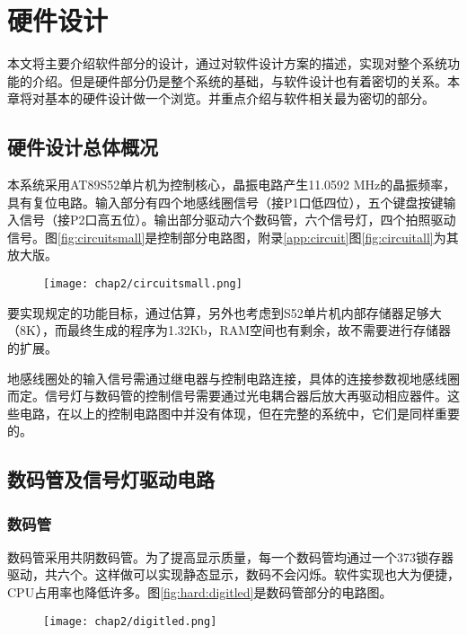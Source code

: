 

\chapter{硬件设计}
\label{chap:hardware}
	本文将主要介绍软件部分的设计，通过对软件设计方案的描述，实现对整个系统功能的介绍。但是硬件部分仍是整个系统的基础，与软件设计也有着密切的关系。本章将对基本的硬件设计做一个浏览。并重点介绍与软件相关最为密切的部分。
\section{硬件设计总体概况}
	本系统采用AT89S52单片机为控制核心，晶振电路产生11.0592 MHz的晶振频率，具有复位电路。输入部分有四个地感线圈信号（接P1口低四位），五个键盘按键输入信号（接P2口高五位）。输出部分驱动六个数码管，六个信号灯，四个拍照驱动信号。图\ref{fig:circuitsmall}是控制部分电路图，附录\ref{app:circuit}图\ref{fig:circuitall}为其放大版。
	
\begin{figure}[!tbh]
  \centering
  \texttt{[image: chap2/circuitsmall.png]}
\end{figure}
	要实现规定的功能目标，通过估算，另外也考虑到S52单片机内部存储器足够大（8K），而最终生成的程序为1.32Kb，RAM空间也有剩余，故不需要进行存储器的扩展。
	
	地感线圈处的输入信号需通过继电器与控制电路连接，具体的连接参数视地感线圈而定。信号灯与数码管的控制信号需要通过光电耦合器后放大再驱动相应器件。这些电路，在以上的控制电路图中并没有体现，但在完整的系统中，它们是同样重要的。
	
\section{数码管及信号灯驱动电路}
	
	\subsection{数码管}
	数码管采用共阴数码管。为了提高显示质量，每一个数码管均通过一个373锁存器驱动，共六个。这样做可以实现静态显示，数码不会闪烁。软件实现也大为便捷，CPU占用率也降低许多。图\ref{fig:hard:digitled}是数码管部分的电路图。
	\begin{figure}[!tbh]
	\centering
	\texttt{[image: chap2/digitled.png]}
	\end{figure}
	
